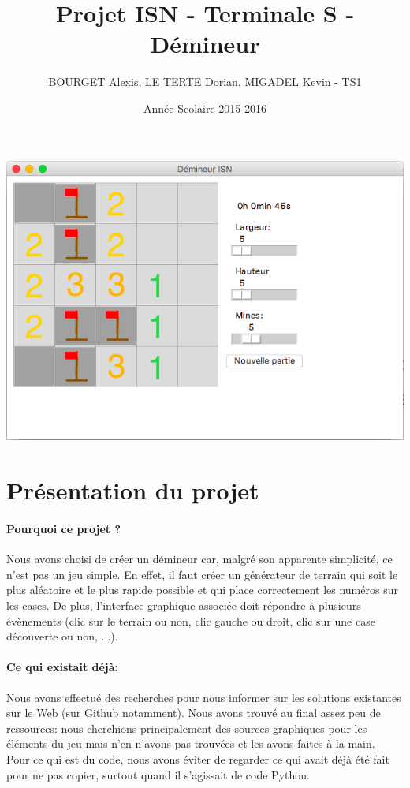\documentclass[12pt, a4paper]{article}
\title{Projet ISN - Terminale S - Démineur}
\author{BOURGET Alexis, LE TERTE Dorian, MIGADEL Kevin - TS1}
\date{Année Scolaire 2015-2016}
\begin{document}
\maketitle
\centerline{\includegraphics[scale=0.5]{presentation_projet.png}}
\newpage
{}
\tableofcontents %
\lstlistoflistings
\newpage
{} %


\section{Présentation du projet}

\paragraph{Pourquoi ce projet ?}
Nous avons choisi de créer un démineur car, malgré son apparente simplicité,
ce n'est pas un jeu simple. En effet, il faut créer un générateur de terrain
qui soit le plus aléatoire et le plus rapide possible et qui place correctement
les numéros sur les cases. De plus, l'interface graphique associée doit
répondre à plusieurs évènements (clic sur le terrain ou non, clic gauche ou
droit, clic sur une case découverte ou non, ...).

\paragraph{Ce qui existait déjà:}
Nous avons effectué des recherches pour nous informer sur les solutions
existantes sur le Web (sur Github notamment). Nous avons trouvé au final assez
peu de ressources: nous cherchions principalement des sources graphiques pour
les éléments du jeu mais n'en n'avons pas trouvées et les avons faites à la
main. \\
Pour ce qui est du code, nous avons éviter de regarder ce qui avait déjà été
fait pour ne pas copier, surtout quand il s'agissait de code Python.
\end{document}
